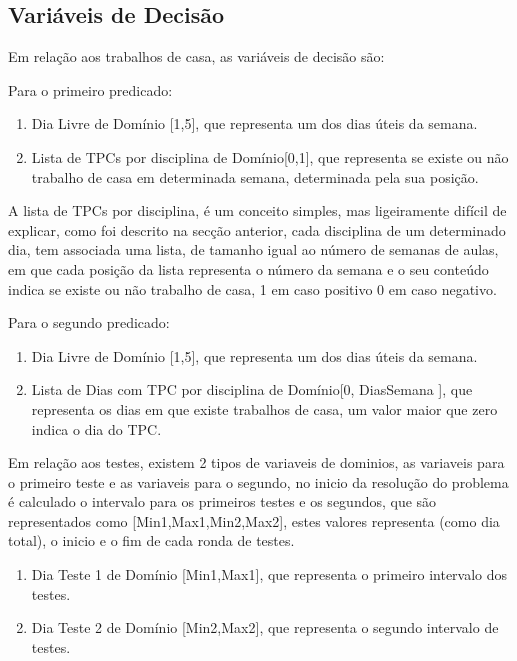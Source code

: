 \documentclass{llncs}
\begin{document}
\subsection{Variáveis de Decisão}

Em relação aos trabalhos de casa, as variáveis de decisão são:

Para o primeiro predicado:
\begin{enumerate}
\item Dia Livre de Domínio [1,5], que representa um dos dias úteis da semana.
\item Lista de TPCs por disciplina de Domínio[0,1], que representa se existe ou não trabalho de casa em determinada semana, determinada pela sua posição.
\end{enumerate}

A lista de TPCs por disciplina, é um conceito simples, mas ligeiramente difícil de explicar, como foi descrito na secção anterior, cada disciplina de um determinado dia, tem associada uma lista, de tamanho igual ao número de semanas de aulas, em que cada posição da lista representa o número da semana e o seu conteúdo indica se existe ou não trabalho de casa, 1 em caso positivo 0 em caso negativo.

Para o segundo predicado:
\begin{enumerate}
\item Dia Livre de Domínio [1,5], que representa um dos dias úteis da semana.
\item Lista de Dias com TPC por disciplina de Domínio[0, DiasSemana ], que representa os dias em que existe trabalhos de casa, um valor maior que zero indica o dia do TPC.
\end{enumerate}

%
Em relação aos testes, existem 2 tipos de variaveis de dominios, as variaveis para o primeiro teste e as variaveis para o segundo, no inicio da resolução do problema é calculado o intervalo para os primeiros testes e os segundos, que são representados como [Min1,Max1,Min2,Max2], estes valores representa (como dia total), o inicio e o fim de cada ronda de testes.


\begin{enumerate}
\item Dia Teste 1 de Domínio [Min1,Max1], que representa o primeiro intervalo dos testes.
\item Dia Teste 2 de Domínio [Min2,Max2], que representa o segundo intervalo de testes.
\end{enumerate}
\end{document}

